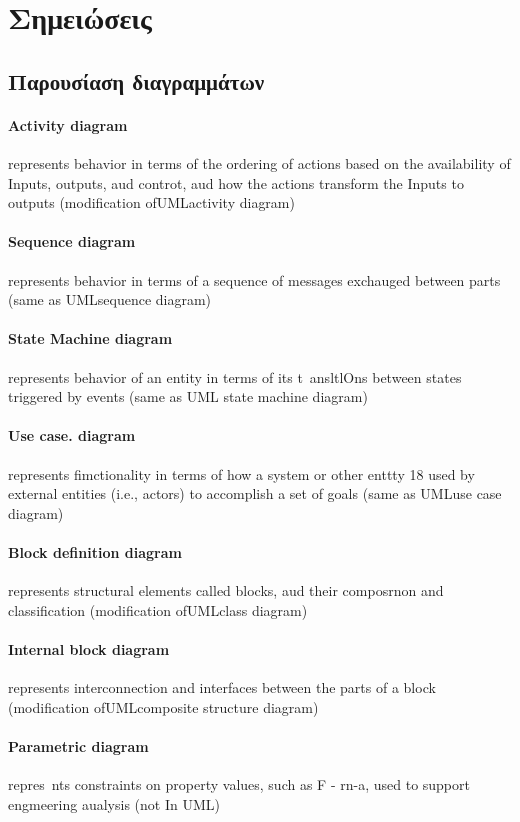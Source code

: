 \documentclass[a4paper,12pt,twoside]{report}
\begin{document}
{		\section{Σημειώσεις}	
		\subsection{Παρουσίαση διαγραμμάτων \cite{APracticalGuideToSysML}}
			
			\paragraph{Activity diagram} {represents behavior in terms of the ordering of actions based on the availability of Inputs, outputs, aud controt, aud how the actions transform the Inputs to outputs (modification ofUMLactivity diagram)
			}
			\paragraph{Sequence diagram} {represents behavior in terms of a sequence of messages exchauged between parts (same as UMLsequence diagram)
			}
			\paragraph{State Machine diagram} {represents behavior of an entity in terms of its t~ansltlOns between states triggered by events (same as UML state machine diagram)
			}
			\paragraph{Use case. diagram} {represents fimctionality in terms of how a system or other enttty 18 used by external entities (i.e., actors) to accomplish a set of goals (same as UMLuse case diagram)
			}
			\paragraph{Block definition diagram} {represents structural elements called blocks, aud their composrnon and classification (modification ofUMLclass diagram)
			}
			\paragraph{Internal block diagram} {represents interconnection and interfaces between the parts of a block (modification ofUMLcomposite structure diagram)
			}
			\paragraph{Parametric diagram} {repres~nts constraints on property values, such as F - rn-a, used to support engmeering aualysis
			(not In UML)
			}
}
\end{document}
